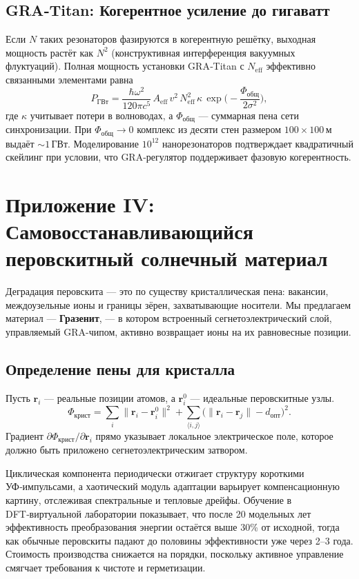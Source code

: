 \documentclass[12pt,a4paper]{article}
\begin{document}
\subsection{GRA‑Titan: Когерентное усиление до гигаватт}
Если $N$ таких резонаторов фазируются в когерентную решётку, выходная мощность растёт как $N^2$ (конструктивная интерференция вакуумных флуктуаций).
Полная мощность установки GRA‑Titan с $N_{\text{eff}}$ эффективно связанными элементами равна
\begin{equation}
P_{\text{ГВт}} = \frac{\hbar \omega^2}{120\pi c^5} \, A_{\text{eff}} \, v^2 \, N_{\text{eff}}^2 \, \kappa \,
\exp\!\Big(-\frac{\Phi_{\text{общ}}}{2\sigma^2}\Big),
\end{equation}
где $\kappa$ учитывает потери в волноводах, а $\Phi_{\text{общ}}$ — суммарная пена сети синхронизации.
При $\Phi_{\text{общ}}\to0$ комплекс из десяти стен размером $100\times100$\,м выдаёт $\sim 1$\,ГВт.
Моделирование $10^{12}$ нанорезонаторов подтверждает квадратичный скейлинг при условии, что GRA-регулятор поддерживает фазовую когерентность.

\section{Приложение IV: Самовосстанавливающийся перовскитный солнечный материал}
\label{sec:solar}

Деградация перовскита — это по существу кристаллическая пена: вакансии, междоузельные ионы и границы зёрен, захватывающие носители.
Мы предлагаем материал — \textbf{Гразенит}, — в котором встроенный сегнетоэлектрический слой, управляемый GRA-чипом, активно возвращает ионы на их равновесные позиции.

\subsection{Определение пены для кристалла}
Пусть $\mathbf{r}_i$ — реальные позиции атомов, а $\mathbf{r}_i^0$ — идеальные перовскитные узлы.
\begin{equation}
\Phi_{\text{крист}} = \sum_i \|\mathbf{r}_i - \mathbf{r}_i^0\|^2 + \sum_{\langle i,j\rangle} \big( \|\mathbf{r}_i-\mathbf{r}_j\| - d_{\text{опт}} \big)^2.
\end{equation}
Градиент $\partial\Phi_{\text{крист}}/\partial \mathbf{r}_i$ прямо указывает локальное электрическое поле, которое должно быть приложено сегнетоэлектрическим затвором.

Циклическая компонента периодически отжигает структуру короткими УФ‑импульсами, а хаотический модуль адаптации варьирует компенсационную картину, отслеживая спектральные и тепловые дрейфы.
Обучение в DFT‑виртуальной лаборатории показывает, что после 20 модельных лет эффективность преобразования энергии остаётся выше 30\% от исходной, тогда как обычные перовскиты падают до половины эффективности уже через 2–3 года.
Стоимость производства снижается на порядки, поскольку активное управление смягчает требования к чистоте и герметизации.
\end{document}
